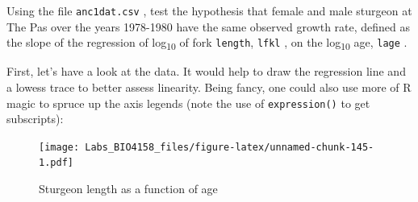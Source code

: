\documentclass[
  12pt,
]{book}
\makeatletter
\newenvironment{Shaded}{\begin{snugshade}}{\end{snugshade}}
\newcommand{\DataTypeTok}[1]{\textcolor[rgb]{0.13,0.29,0.53}{#1}}
\newcommand{\DecValTok}[1]{\textcolor[rgb]{0.00,0.00,0.81}{#1}}
\newcommand{\KeywordTok}[1]{\textcolor[rgb]{0.13,0.29,0.53}{\textbf{#1}}}
\newcommand{\NormalTok}[1]{#1}
\newcommand{\OperatorTok}[1]{\textcolor[rgb]{0.81,0.36,0.00}{\textbf{#1}}}
\newcommand{\OtherTok}[1]{\textcolor[rgb]{0.56,0.35,0.01}{#1}}
\newcommand{\StringTok}[1]{\textcolor[rgb]{0.31,0.60,0.02}{#1}}
\newenvironment{kframe}{%
\medskip{}
\setlength{\fboxsep}{.8em}
\def\at@end@of@kframe{}%
\ifinner\ifhmode%
 \def\at@end@of@kframe{\end{minipage}}%
 \begin{minipage}{\columnwidth}%
\fi\fi%
\def\FrameCommand##1{\hskip\@totalleftmargin \hskip-\fboxsep
\colorbox{incolor}{##1}\hskip-\fboxsep
    \hskip-\linewidth \hskip-\@totalleftmargin \hskip\columnwidth}%
\MakeFramed {\advance\hsize-\width
  \@totalleftmargin\z@ \linewidth\hsize
  \@setminipage}}%
{\par\unskip\endMakeFramed%
\at@end@of@kframe}
\newenvironment{rmdblock}[1]
 {
 \begin{itemize}
 \renewcommand{\labelitemi}{
   \raisebox{-.7\height}[0pt][0pt]{
     {\setkeys{Gin}{width=3em,keepaspectratio}\texttt{[image: images/\#1]}}
   }
 }
 \begin{kframe}
 \setlength{\fboxsep}{1em}
 \item
 }
 {
 \end{kframe}
 \end{itemize}
 }
\newenvironment{rmdcode}
  {\begin{rmdblock}{screen}}
  {\end{rmdblock}}
\makeatother
\begin{document}
\begin{rmdcode}
Using the file \texttt{anc1dat.csv} , test the hypothesis that female and male sturgeon at The Pas over the years 1978-1980 have the same observed growth rate, defined as the slope of the regression of log\textsubscript{10} of fork \texttt{length}, \texttt{lfkl} , on the log\textsubscript{10} age, \texttt{lage} .
\end{rmdcode}

First, let's have a look at the data. It would help to draw the regression line and a lowess trace to better assess linearity. Being fancy, one could also use more of R magic to spruce up the axis legends (note the use of \texttt{expression()} to get subscripts):

\begin{Shaded}
\end{Shaded}

\begin{figure}
\centering
\texttt{[image: Labs\_BIO4158\_files/figure-latex/unnamed-chunk-145-1.pdf]}
\caption{\label{fig:unnamed-chunk-145}Sturgeon length as a function of age}
\end{figure}
\end{document}
